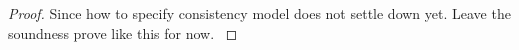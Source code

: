 \begin{proof}
{    Since how to specify consistency model does not settle down yet.
    Leave the soundness prove like this for now.
}

\end{proof}
